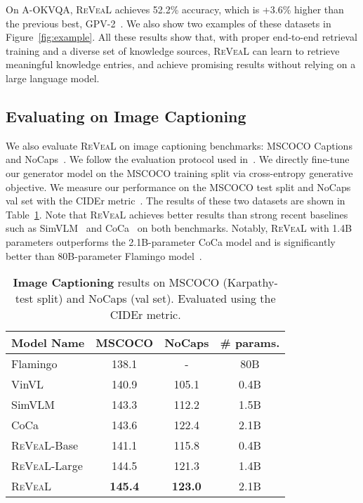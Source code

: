 \documentclass[10pt,twocolumn,letterpaper]{article}
\newcommand{\method}{R\textsc{e}V\textsc{ea}L\xspace}
\begin{document}
On A-OKVQA, 
\method achieves 52.2\% accuracy, which is +3.6\% higher than the previous best, GPV-2~\cite{DBLP:conf/eccv/KamathCGKHK22}. We also show two examples of these datasets in Figure~\ref{fig:example}.
All these results show that, with proper end-to-end retrieval training and a diverse set of knowledge sources, \method can learn to retrieve meaningful knowledge entries, and achieve promising results without relying on a large language model.



\subsection{Evaluating on Image Captioning}\label{sec:caption}

We also evaluate \method on image captioning benchmarks: MSCOCO Captions~\cite{DBLP:journals/corr/ChenFLVGDZ15} and NoCaps~\cite{DBLP:conf/iccv/AgrawalAD0CJ0BP19}. We follow the evaluation protocol used in~\cite{DBLP:journals/corr/abs-2205-01917}. We directly fine-tune our generator model on the MSCOCO training split via cross-entropy generative objective. We measure our performance on the MSCOCO test split and NoCaps val set with the CIDEr metric~\cite{DBLP:conf/cvpr/VedantamZP15}. 
The results of these two datasets are shown in Table~\ref{tab:caption}. Note that \method achieves better results than strong recent baselines such as SimVLM~\cite{DBLP:conf/iclr/WangYYDT022} and CoCa~\cite{DBLP:journals/corr/abs-2205-01917} on both benchmarks. Notably, \method with 1.4B parameters outperforms the 2.1B-parameter CoCa model and is significantly better than 80B-parameter Flamingo model~\cite{DBLP:journals/corr/abs-2204-14198}. 

\begin{table}[t!]
\centering
\footnotesize
\vspace{-.1in}
\begin{tabular}{l|cc|c} \toprule
\textbf{Model Name} & \textbf{MSCOCO} & \textbf{NoCaps} & \textbf{\# params.} \\ \midrule
Flamingo~\cite{DBLP:journals/corr/abs-2204-14198}  & 138.1 & -   & 80B\\
VinVL~\cite{DBLP:conf/cvpr/ZhangLHY0WCG21} & 140.9 & 105.1 & 0.4B \\
SimVLM~\cite{DBLP:conf/iclr/WangYYDT022}  & 143.3 & 112.2 & 1.5B\\
CoCa~\cite{DBLP:journals/corr/abs-2205-01917} & 143.6 & 122.4 & 2.1B \\ 
\midrule
\method-Base & 141.1 & 115.8 & 0.4B  \\
\method-Large & 144.5 & 121.3 & 1.4B \\
\method & \textbf{145.4} & \textbf{123.0} & 2.1B \\\bottomrule
\end{tabular}
    \vspace{-.1in}
\caption{\textbf{Image Captioning} results on MSCOCO (Karpathy-test split) and NoCaps (val set). Evaluated using the CIDEr metric.}
\label{tab:caption}
\end{table}
\end{document}
